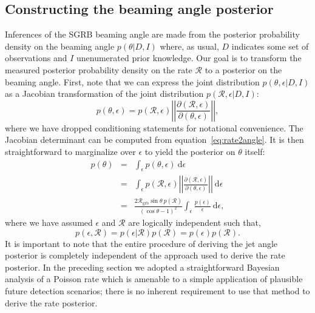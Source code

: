 \documentclass[twocolumn]{aastex61}
\newcommand{\grbrate}{{{\mathcal R}_{\mathrm{grb}}}}
\newcommand{\cbcrate}{{{\mathcal R}}}
\newcommand{\diff}{{\mathrm d}}
\begin{document}
\subsection{Constructing the beaming angle posterior}
Inferences of the \ac{SGRB} beaming angle are made from the posterior
probability density on the beaming angle $p(\theta|D,I)$ where, as
usual, $D$ indicates some set of observations and $I$ unenumerated
prior knowledge.  Our goal is to transform the measured posterior
probability density on the rate $\cbcrate$ to a posterior on the
beaming angle.
%
First, note that we can express the joint distribution
$p(\theta, \epsilon|D,I)$ as a Jacobian transformation of the joint
distribution $p(\cbcrate, \epsilon|D,I)$:
\begin{equation}
p(\theta,\epsilon) = p(\cbcrate,\epsilon)
\left\lvert\left\lvert
\frac{\partial(\cbcrate,\epsilon)}{\partial(\theta,\epsilon)}
\right\rvert\right\rvert,
\end{equation}
%
where we have dropped conditioning statements for notational convenience.
The Jacobian determinant can be  computed from equation~\ref{eq:rate2angle}.
It is then straightforward to marginalize over $\epsilon$ to yield the posterior on $\theta$ itself:
%
\begin{eqnarray}
    \label{eq:beam_posterior}
    p(\theta) & = & \int_{\epsilon} p(\theta,\epsilon)~\diff \epsilon\\
              & = & \int_{\epsilon} p(\cbcrate,\epsilon)
    \left\lvert\left\lvert
    \frac{\partial(\cbcrate,\epsilon)}{\partial(\theta,\epsilon)}
    \right\rvert\right\rvert~\diff \epsilon \\
              & = & \frac{2\grbrate \sin
\theta~p(\cbcrate)}{(\cos\theta-1)^2}\int_{\epsilon}
\frac{p(\epsilon)}{\epsilon} ~\diff \epsilon,
\end{eqnarray}
%
where we have assumed $\epsilon$ and $\cbcrate$ are logically independent such that,
\begin{equation}
p(\epsilon,\cbcrate) = p(\epsilon|\cbcrate)p(\cbcrate) = p(\epsilon)p(\cbcrate).
\end{equation}
%
It is important to note that the entire procedure of deriving the jet
angle posterior is completely independent of the approach used to
derive the rate posterior.  In the preceding section we adopted a
straightforward Bayesian analysis of a Poisson rate which is amenable
to a simple application of plausible future detection scenarios; there
is no inherent requirement to use that method to derive the rate
posterior.
\end{document}
